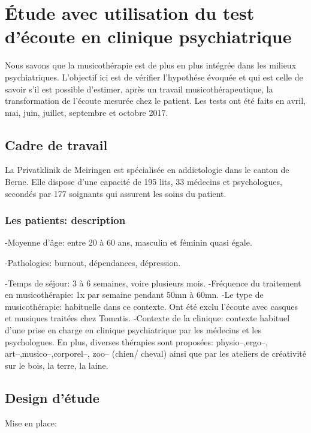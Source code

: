 \chapter[\'Etude en clinique]{\'Etude avec utilisation du test
  d'écoute en clinique psychiatrique}

Nous savons que la musicothérapie est de plus en plus intégrée dans
les milieux psychiatriques.
L'objectif ici est de vérifier l'hypothése évoquée et qui est celle de savoir s'il est possible d'estimer, après un travail 
musicothérapeutique, la transformation de l'écoute mesurée chez le
patient.
Les tests ont été faits en avril, mai, juin, juillet, septembre et octobre 2017.

\section{Cadre de travail}

 La Privatklinik
de Meiringen est  spécialisée en
addictologie dans le canton de Berne. Elle dispose d'une capacité de 195 lits, 33 médecins et
psychologues, secondés par 177 soignants qui assurent les soins du
patient.




\subsection{Les patients: description}


-Moyenne d'âge:  entre 20 à 60 ans, masculin et féminin quasi égale.


-Pathologies:  burnout, dépendances, dépression.

-Temps de séjour: 3 à 6 semaines, voire plusieurs mois.
-Fréquence du traitement en musicothérapie: 1x par semaine pendant
50mn à 60mn.
-Le type de musicothérapie: habituelle dans ce contexte.
Ont été  exclu l'écoute avec casques et  musiques traitées chez Tomatis.
-Contexte de la clinique: contexte habituel d'une prise en
charge en clinique psychiatrique 
par les médecins et  les psychologues.
En plus, diverses thérapies sont proposées: physio--,ergo--,
art--,musico--,corporel--, zoo--  (chien/ cheval)  ainsi
que par les  ateliers de créativité sur le bois, la terre, la laine.  


\section{Design d'étude}

Mise en place:

